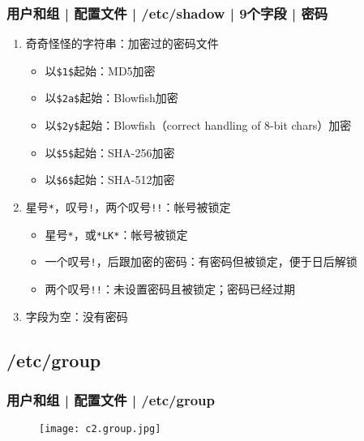 \begin{frame}[fragile]
  \frametitle{用户和组 | 配置文件 | /etc/shadow | 9个字段 | 密码}
  \begin{enumerate}
    \item 奇奇怪怪的字符串：加密过的密码文件 
      \begin{itemize}
        \item 以\verb|$1$|起始：MD5加密
        \item 以\verb|$2a$|起始：Blowfish加密
        \item 以\verb|$2y$|起始：Blowfish（correct handling of 8-bit chars）加密
        \item 以\verb|$5$|起始：SHA-256加密
        \item 以\verb|$6$|起始：SHA-512加密
      \end{itemize}
    \item 星号\verb|*|，叹号\verb|!|，两个叹号\verb|!!|：\alert{帐号被锁定}
      \begin{itemize}
        \item 星号\verb|*|，或\verb|*LK*|：帐号被锁定
        \item 一个叹号\verb|!|，后跟加密的密码：有密码但被锁定，便于日后解锁
        \item 两个叹号\verb|!!|：未设置密码且被锁定；密码已经过期
      \end{itemize}
    \item 字段为空：没有密码
  \end{enumerate}
\end{frame}

\subsection{/etc/group}
\begin{frame}
  \frametitle{用户和组 | 配置文件 | /etc/group}
  \begin{figure}
    \centering
    \texttt{[image: c2.group.jpg]}
  \end{figure}
\end{frame}

